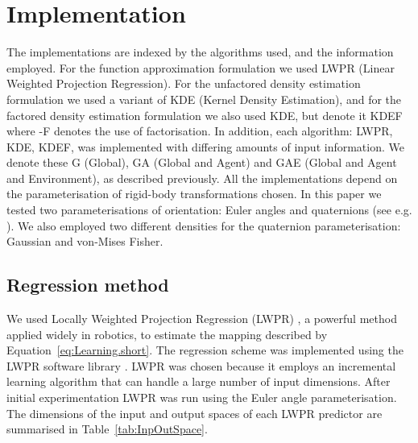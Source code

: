 \section{Implementation}\label{sec:Implementation}

\newcommand{\bx}{\mathbf{x}}
\newcommand{\by}{\mathbf{y}}

The implementations are indexed by the algorithms used, and the information employed. For the function approximation formulation we used LWPR (Linear Weighted Projection Regression). For the unfactored density estimation formulation we used a variant of KDE (Kernel Density Estimation), and for the factored density estimation formulation we also used KDE, but denote it KDEF where -F denotes the use of factorisation. In addition, each algorithm: LWPR, KDE, KDEF, was implemented with differing amounts of input information. We denote these G (Global), GA (Global and Agent) and GAE (Global and Agent and Environment), as described previously. All the implementations depend on the parameterisation of rigid-body transformations chosen. In this paper we tested two parameterisations of orientation: Euler angles and quaternions (see e.g. \cite{murray_mathematical_1994}). We also employed two different densities for the quaternion parameterisation: Gaussian and von-Mises Fisher.

\subsection{Regression method}\label{sec:Implementation.regression}

We used Locally Weighted Projection Regression (LWPR) \cite{vijayakumar_incremental_2005}, a powerful method applied widely in robotics, to estimate the mapping described by Equation~\eqref{eq:Learning.short}. The regression scheme was implemented using the LWPR software library \cite{klanke_library_2008}. LWPR was chosen because it employs an incremental learning algorithm that can handle a large number of input dimensions. After initial experimentation LWPR was run using the Euler angle parameterisation. The dimensions of the input and output spaces of each LWPR predictor are summarised in Table~\ref{tab:InpOutSpace}.



